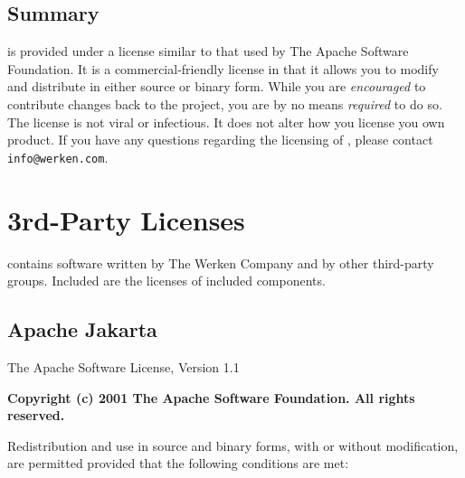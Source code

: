 \normalsize

\subsection{Summary}

\drools{} is provided under a license similar to that used by
The Apache Software Foundation.  It is a commercial-friendly license
in that it allows you to modify and distribute \drools{} in either
source or binary form.  While you are \emph{encouraged} to contribute
changes back to the project, you are by no means \emph{required} to
do so.   The \drools{} license is not viral or infectious.  It
does not alter how you license you own product.  If you have any
questions regarding the licensing of \drools{}, please contact
\verb|info@werken.com|.

\clearpage

\section{3rd-Party Licenses}

\drools{} contains software written by The Werken Company and by
other third-party groups.  Included are the licenses of included
components.


\subsection{Apache Jakarta}

\small

The Apache Software License, Version 1.1

{\center \textbf{\textsf{Copyright (c) 2001 The Apache Software Foundation.  All rights reserved.}}\\}

\bigskip

Redistribution and use in source and binary forms, with or without
modification, are permitted provided that the following conditions
are met:

